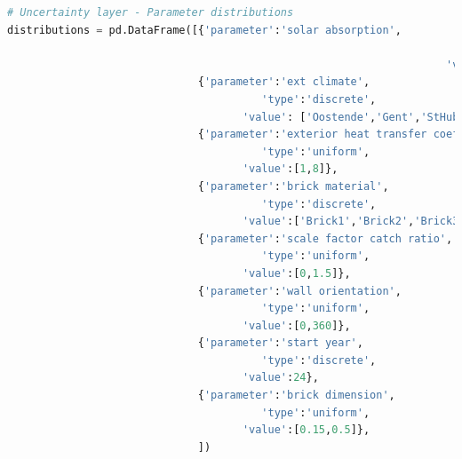 \documentclass{article}
\begin{document}
\begin{minipage}{\linewidth}
\begin{lstlisting}[language=Python, caption=Define the parameter distributions.]
# Uncertainty layer - Parameter distributions
distributions = pd.DataFrame([{'parameter':'solar absorption', 
																		'type':'uniform',   
																	 'value':[0.4,0.8]},
                              {'parameter':'ext climate',
                                		'type':'discrete',  
                                	 'value': ['Oostende','Gent','StHubert','Gaasbeek']},
                              {'parameter':'exterior heat transfer coefficient slope',
                                		'type':'uniform',  
                                	 'value':[1,8]},
                              {'parameter':'brick material',
                                		'type':'discrete',   
                                	 'value':['Brick1','Brick2','Brick3']},
                              {'parameter':'scale factor catch ratio',
                                		'type':'uniform',    
                                	 'value':[0,1.5]},
                              {'parameter':'wall orientation', 
                                		'type':'uniform',  
                                	 'value':[0,360]},
                              {'parameter':'start year',  
                                		'type':'discrete',   
                                	 'value':24},
                              {'parameter':'brick dimension',
                                		'type':'uniform',    
                                	 'value':[0.15,0.5]},
                              ])
\end{lstlisting}
\label{list:distr}
\end{minipage}
\end{document}
